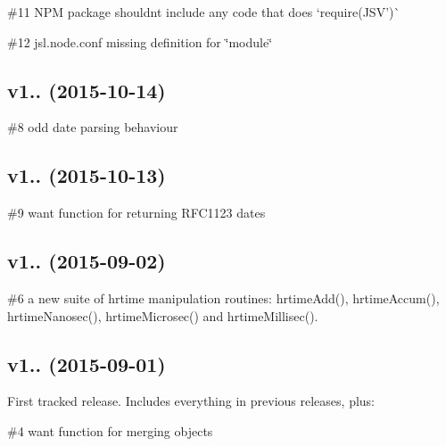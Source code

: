 \begin{DoxyItemize}
\item \#11 N\+PM package shouldn\textquotesingle{}t include any code that does `require(\textquotesingle{}J\+SV')\`{}
\item \#12 jsl.\+node.\+conf missing definition for \char`\"{}module\char`\"{}
\end{DoxyItemize}

\subsection*{v1.. (2015-\/10-\/14)}


\begin{DoxyItemize}
\item \#8 odd date parsing behaviour
\end{DoxyItemize}

\subsection*{v1.. (2015-\/10-\/13)}


\begin{DoxyItemize}
\item \#9 want function for returning R\+F\+C1123 dates
\end{DoxyItemize}

\subsection*{v1.. (2015-\/09-\/02)}


\begin{DoxyItemize}
\item \#6 a new suite of hrtime manipulation routines\+: {\ttfamily hrtime\+Add()}, {\ttfamily hrtime\+Accum()}, {\ttfamily hrtime\+Nanosec()}, {\ttfamily hrtime\+Microsec()} and {\ttfamily hrtime\+Millisec()}.
\end{DoxyItemize}

\subsection*{v1.. (2015-\/09-\/01)}

First tracked release. Includes everything in previous releases, plus\+:


\begin{DoxyItemize}
\item \#4 want function for merging objects 
\end{DoxyItemize}